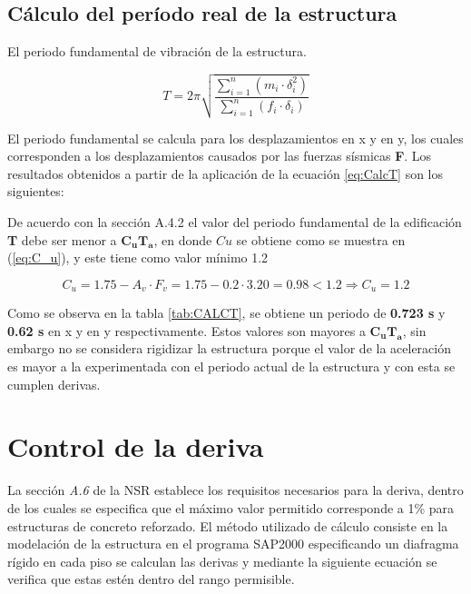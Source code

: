 \documentclass[12pt]{article}
\begin{document}
\subsection{Cálculo del período real de la estructura}
 El periodo fundamental de vibración de la estructura.

\begin{equation}
    T = 2\pi \sqrt{\frac{\displaystyle\sum_{i=1}^{n}\left( m_{i} \cdot  \delta_{i}^2\right)}{\displaystyle\sum_{i=1}^{n}\left(f_{i}  \cdot \delta_{i}\right)}}
    \label{eq:CalcT}
\end{equation}

El periodo fundamental se calcula  para los desplazamientos en x y en y, los cuales corresponden a los desplazamientos causados por las fuerzas sísmicas \textbf{F}. Los resultados obtenidos a partir de la aplicación de la ecuación \ref{eq:CalcT} son los siguientes:


De acuerdo con la sección A.4.2 el valor del periodo fundamental de la edificación \textbf{T} debe ser menor a $ \mathbf{C_{u} T_{a}} $, en donde $Cu$ se obtiene como se muestra en (\ref{eq:C_u}), y este tiene como valor mínimo 1.2

\begin{equation}
    C_{u}=1.75-A_{v}\cdot F_{v} =1.75-0.2 \cdot 3.20 =0.98 < 1.2 \Rightarrow C_{u}=1.2
    \label{eq:C_u}
\end{equation}

Como se observa en la tabla \ref{tab:CALCT}, se obtiene un periodo de \textbf{0.723 s} y \textbf{0.62 s} en x y en y respectivamente. Estos valores son mayores a $\mathbf{C_{u}T_{a}}$, sin embargo no se considera rigidizar la estructura porque el valor de la aceleración es mayor a la experimentada con el periodo actual de la estructura y con esta se cumplen derivas.

\section{Control de la deriva}

La sección \textit{A.6} de la NSR establece los requisitos necesarios para la deriva, dentro de los cuales se especifica que el máximo valor permitido corresponde a 1\% para estructuras de concreto reforzado. El método utilizado de cálculo consiste en la modelación de la estructura en el programa SAP2000 especificando un diafragma rígido en cada piso se calculan las derivas y mediante la siguiente ecuación se verifica que estas estén dentro del rango permisible.
\end{document}
